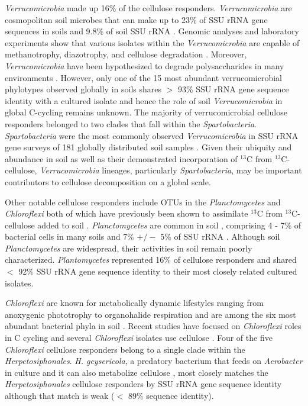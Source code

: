 \textit{Verrucomicrobia} made up 16\% of the cellulose responders.
\textit{Verrucomicrobia} are cosmopolitan soil microbes \citep{Bergmann_2011}
that can make up to 23\% of SSU rRNA gene sequences in soils
\citep{Bergmann_2011} and 9.8\% of soil SSU rRNA \citep{Buckley_2001}. Genomic
analyses and laboratory experiments show that various isolates
within the \textit{Verrucomicrobia} are capable of methanotrophy, diazotrophy,
and cellulose degradation \citep{Wertz_2011,Otsuka_2012}. Moreover,
\textit{Verrucomicrobia} have been hypothesized to degrade polysaccharides in
many environments \citep{Fierer_2013,10543821,Herlemann_2013}. However, only
one of the 15 most abundant verrucomicrobial phylotypes observed globally in
soils shares $>$ 93\% SSU rRNA gene sequence identity with a cultured isolate
\citep{Bergmann_2011} and hence the role of soil \textit{Verrucomicrobia} in
global C-cycling remains unknown. The majority of verrucomicrobial cellulose
responders belonged to two clades that fall within the \textit{Spartobacteria}.
\textit{Spartobacteria} were the most commonly observed
\textit{Verrucomicrobia} in SSU rRNA gene surveys of
181 globally distributed soil samples \citep{Bergmann_2011}. Given their ubiquity and abundance
in soil as well as their demonstrated incorporation of $^{13}$C from
$^{13}$C-cellulose, \textit{Verrucomicrobia} lineages, particularly
\textit{Spartobacteria}, may be important contributors to cellulose
decomposition on a global scale. 

Other notable cellulose responders include OTUs in the \textit{Planctomycetes}
and \textit{Chloroflexi} both of which have previously been shown to
assimilate $^{13}$C from $^{13}$C-cellulose added to soil
\citep{Schellenberger_2010}. \textit{Planctomycetes} are common in soil
\citep{Janssen2006}, comprising 4 - 7\% of bacterial cells in many soils
\citep{Zarda_1997,Chatzinotas_1998} and 7\% $+/-$ 5\% of SSU rRNA
\citep{buckley_2003}. Although soil \textit{Planctomycetes} are widespread,
their activities in soil remain poorly characterized. \textit{Plantomycetes}
represented 16\% of cellulose responders and shared $<$ 92\% SSU rRNA gene
sequence identity to their most closely related cultured isolates.

\textit{Chloroflexi} are known for metabolically dynamic lifestyles ranging
from anoxygenic phototrophy to organohalide respiration \citep{Hug_2013} and
are among the six most abundant bacterial phyla in soil \citep{Janssen2006}.
Recent studies have focused on \textit{Chloroflexi} roles in C cycling
\citep{Hug_2013,Goldfarb_2011,Cole_2013} and several \textit{Chloroflexi}
isolates use cellulose \citep{Hug_2013,Goldfarb_2011,Cole_2013}. Four
of the five \textit{Chloroflexi} cellulose responders belong to a single clade
within the \textit{Herpetosiphonales}. \textit{H. geysericola}, a predatory
bacterium that feeds on \textit{Aerobacter} in culture and it can also
metabolize cellulose \citep{Lewin1970},  most closely matches the \textit{Herpetosiphonales}
cellulose responders by SSU rRNA gene sequence identity although that match is
weak ($<$ 89\% sequence identity).
 

